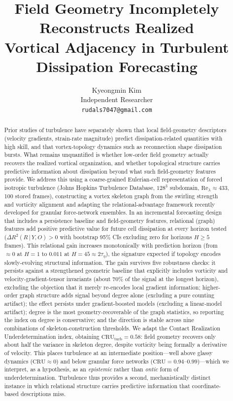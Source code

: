 \documentclass[11pt,a4paper]{article}
\title{\textbf{Field Geometry Incompletely Reconstructs Realized\\Vortical Adjacency in Turbulent Dissipation Forecasting}}
\author{Kyeongmin Kim\\
\small Independent Researcher\\
\small \texttt{rudals7047@gmail.com}}
\date{}
\begin{document}
\maketitle
\thispagestyle{empty}

\begin{abstract}
Prior studies of turbulence have separately shown that local field-geometry descriptors (velocity gradients, strain-rate magnitude) predict dissipation-related quantities with high skill, and that vortex-topology dynamics such as reconnection shape dissipation bursts. What remains unquantified is whether low-order field geometry actually recovers the realized vortical organization, and whether topological structure carries predictive information about dissipation beyond what such field-geometry features provide. We address this using a coarse-grained Eulerian-cell representation of forced isotropic turbulence (Johns Hopkins Turbulence Database, $128^3$ subdomain, $\mathrm{Re}_\lambda \approx 433$, 100 stored frames), constructing a vortex skeleton graph from the swirling strength and vorticity alignment and adapting the relational-advantage framework recently developed for granular force-network ensembles. In an incremental forecasting design that includes a persistence baseline and field-geometry features, relational (graph) features add positive predictive value for future cell dissipation at every horizon tested ($\Delta R^2(R\,|\,Y,O) > 0$ with bootstrap 95\% CIs excluding zero for horizons $H \geq 5$ frames). This relational gain increases monotonically with prediction horizon (from $\approx 0$ at $H{=}1$ to $0.011$ at $H{=}45 \approx 2\tau_\eta$), the signature expected if topology encodes slowly-evolving structural information. The gain survives five robustness checks: it persists against a strengthened geometric baseline that explicitly includes vorticity and velocity-gradient-tensor invariants (about 70\% of the signal at the longest horizon), excluding the objection that it merely re-encodes local gradient information; higher-order graph structure adds signal beyond degree alone (excluding a pure counting artifact); the effect persists under gradient-boosted models (excluding a linear-model artifact); degree is the most geometry-recoverable of the graph statistics, so reporting the index on degree is conservative; and the direction is stable across nine combinations of skeleton-construction thresholds. We adapt the Contact Realization Underdetermination index, obtaining $\mathrm{CRU}_{\text{turb}} = 0.58$: field geometry recovers only about half the variance in skeleton degree, despite vorticity being formally a derivative of velocity. This places turbulence at an intermediate position---well above glassy dynamics ($\mathrm{CRU} \approx 0$) and below granular force networks ($\mathrm{CRU} = 0.94$--$0.99$)---which we interpret, as a hypothesis, as an \emph{epistemic} rather than \emph{ontic} form of underdetermination. Turbulence thus provides a second, mechanistically distinct instance in which relational structure carries predictive information that coordinate-based descriptions miss.
\end{abstract}
\end{document}
